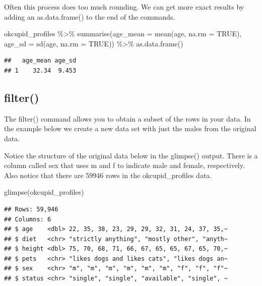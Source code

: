 \documentclass[
]{krantz}
\makeatletter
\newenvironment{Shaded}{\begin{snugshade}}{\end{snugshade}}
\newcommand{\AttributeTok}[1]{\textcolor[rgb]{0.61,0.61,0.61}{#1}}
\newcommand{\ConstantTok}[1]{\textcolor[rgb]{0,0,0}{#1}}
\newcommand{\FunctionTok}[1]{\textcolor[rgb]{0,0,0}{#1}}
\newcommand{\NormalTok}[1]{#1}
\newcommand{\SpecialCharTok}[1]{\textcolor[rgb]{0,0,0}{#1}}
\newenvironment{kframe}{%
\medskip{}
\setlength{\fboxsep}{.8em}
 \def\at@end@of@kframe{}%
 \ifinner\ifhmode%
  \def\at@end@of@kframe{\end{minipage}}%
  \begin{minipage}{\columnwidth}%
 \fi\fi%
 \def\FrameCommand##1{\hskip\@totalleftmargin \hskip-\fboxsep
 \colorbox{shadecolor}{##1}\hskip-\fboxsep
     \hskip-\linewidth \hskip-\@totalleftmargin \hskip\columnwidth}%
 \MakeFramed {\advance\hsize-\width
   \@totalleftmargin\z@ \linewidth\hsize
   \@setminipage}}%
 {\par\unskip\endMakeFramed%
 \at@end@of@kframe}
\renewenvironment{Shaded}{\begin{kframe}}{\end{kframe}}
\makeatother
\begin{document}
Often this process does too much rounding. We can get more exact results by adding an as.data.frame() to the end of the commands.

\begin{Shaded}
\begin{Highlighting}[]
\NormalTok{okcupid\_profiles }\SpecialCharTok{\%\textgreater{}\%} 
  \FunctionTok{summarise}\NormalTok{(}\AttributeTok{age\_mean =} \FunctionTok{mean}\NormalTok{(age, }\AttributeTok{na.rm =} \ConstantTok{TRUE}\NormalTok{),}
            \AttributeTok{age\_sd =} \FunctionTok{sd}\NormalTok{(age, }\AttributeTok{na.rm =} \ConstantTok{TRUE}\NormalTok{)) }\SpecialCharTok{\%\textgreater{}\%}
  \FunctionTok{as.data.frame}\NormalTok{()}
\end{Highlighting}
\end{Shaded}

\begin{verbatim}
##   age_mean age_sd
## 1    32.34  9.453
\end{verbatim}

\hypertarget{filter}{%
\subsection{filter()}\label{filter}}

The filter() command allows you to obtain a subset of the rows in your data. In the example below we create a new data set with just the males from the original data.

Notice the structure of the original data below in the glimpse() output. There is a column called sex that uses m and f to indicate male and female, respectively. Also notice that there are 59946 rows in the okcupid\_profiles data.

\begin{Shaded}
\begin{Highlighting}[]
\FunctionTok{glimpse}\NormalTok{(okcupid\_profiles)}
\end{Highlighting}
\end{Shaded}

\begin{verbatim}
## Rows: 59,946
## Columns: 6
## $ age    <dbl> 22, 35, 38, 23, 29, 29, 32, 31, 24, 37, 35,~
## $ diet   <chr> "strictly anything", "mostly other", "anyth~
## $ height <dbl> 75, 70, 68, 71, 66, 67, 65, 65, 67, 65, 70,~
## $ pets   <chr> "likes dogs and likes cats", "likes dogs an~
## $ sex    <chr> "m", "m", "m", "m", "m", "m", "f", "f", "f"~
## $ status <chr> "single", "single", "available", "single", ~
\end{verbatim}
\end{document}
